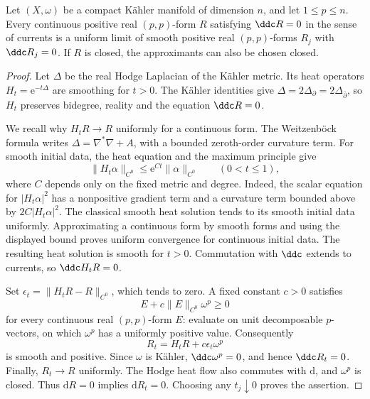 \begin{lemma}\label{lem:continuous-pluriharmonic-smoothing}
Let $(X,\omega)$ be a compact K\"ahler manifold of dimension $n$, and let $1\leq p\leq n$. Every continuous positive real $(p,p)$-form $R$ satisfying $\ddc R=0$ in the sense of currents is a uniform limit of smooth positive real $(p,p)$-forms $R_j$ with $\ddc R_j=0$. If $R$ is closed, the approximants can also be chosen closed.
\end{lemma}
\begin{proof}
Let $\Delta$ be the real Hodge Laplacian of the K\"ahler metric. Its heat operators $H_t=\mathrm e^{-t\Delta}$ are smoothing for $t>0$. The K\"ahler identities give $\Delta=2\Delta_\partial=2\Delta_{\bar\partial}$, so $H_t$ preserves bidegree, reality and the equation $\ddc R=0$.

We recall why $H_tR\to R$ uniformly for a continuous form. The Weitzenb\"ock formula writes $\Delta=\nabla^*\nabla+A$, with a bounded zeroth-order curvature term. For smooth initial data, the heat equation and the maximum principle give
\[
 \|H_t\alpha\|_{C^0}\leq\mathrm e^{Ct}\|\alpha\|_{C^0}
 \qquad(0<t\leq1),
\]
where $C$ depends only on the fixed metric and degree. Indeed, the scalar equation for $|H_t\alpha|^2$ has a nonpositive gradient term and a curvature term bounded above by $2C|H_t\alpha|^2$. The classical smooth heat solution tends to its smooth initial data uniformly. Approximating a continuous form by smooth forms and using the displayed bound proves uniform convergence for continuous initial data. The resulting heat solution is smooth for $t>0$. Commutation with $\ddc$ extends to currents, so $\ddc H_tR=0$.

Set $\epsilon_t=\|H_tR-R\|_{C^0}$, which tends to zero. A fixed constant $c>0$ satisfies
\[
 E+c\|E\|_{C^0}\omega^p\geq0
\]
for every continuous real $(p,p)$-form $E$: evaluate on unit decomposable $p$-vectors, on which $\omega^p$ has a uniformly positive value. Consequently
\[
 R_t=H_tR+c\epsilon_t\omega^p
\]
is smooth and positive. Since $\omega$ is K\"ahler, $\ddc\omega^p=0$, and hence $\ddc R_t=0$. Finally, $R_t\to R$ uniformly. The Hodge heat flow also commutes with $\mathrm{d}$, and $\omega^p$ is closed. Thus $\mathrm{d}R=0$ implies $\mathrm{d}R_t=0$. Choosing any $t_j\downarrow0$ proves the assertion.
\end{proof}
